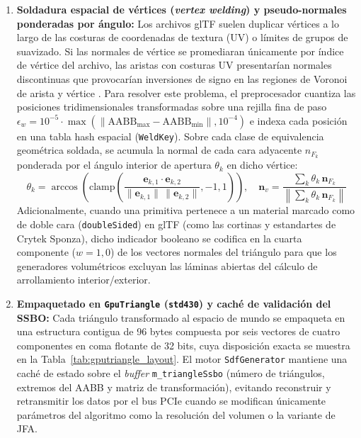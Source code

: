 \begin{enumerate}
  \begin{equation}
    \mathbf{M}_{\text{fit}} = \mathbf{T}(\mathbf{o}_w) \cdot \mathbf{S}(s, s, s) \cdot \mathbf{T}\!\left(-\frac{\text{AABB}_{\min} + \text{AABB}_{\max}}{2}\right)
  \end{equation}
  Este margen perimetral garantiza que la isosuperficie cero quede completamente contenida en el interior del dominio discretizado y evita discontinuidades de borde durante el muestreo trilineal.
  \item \textbf{Soldadura espacial de vértices (\textit{vertex welding}) y pseudo-normales ponderadas por ángulo:} Los archivos glTF suelen duplicar vértices a lo largo de las costuras de coordenadas de textura (UV) o límites de grupos de suavizado. Si las normales de vértice se promediaran únicamente por índice de vértice del archivo, las aristas con costuras UV presentarían normales discontinuas que provocarían inversiones de signo en las regiones de Voronoi de arista y vértice \cite{baerentzen2005}. Para resolver este problema, el preprocesador cuantiza las posiciones tridimensionales transformadas sobre una rejilla fina de paso $\epsilon_w = 10^{-5} \cdot \max(\|\text{AABB}_{\max} - \text{AABB}_{\min}\|, 10^{-4})$ e indexa cada posición en una tabla hash espacial (\texttt{WeldKey}). Sobre cada clase de equivalencia geométrica soldada, se acumula la normal de cada cara adyacente $n_{F_k}$ ponderada por el ángulo interior de apertura $\theta_k$ en dicho vértice:
  \begin{equation}
    \theta_k = \arccos\!\left(\text{clamp}\!\left(\frac{\mathbf{e}_{k,1} \cdot \mathbf{e}_{k,2}}{\|\mathbf{e}_{k,1}\| \, \|\mathbf{e}_{k,2}\|}, -1, 1\right)\right), \quad \mathbf{n}_v = \frac{\sum_{k} \theta_k \, \mathbf{n}_{F_k}}{\left\|\sum_{k} \theta_k \, \mathbf{n}_{F_k}\right\|}
  \end{equation}
  Adicionalmente, cuando una primitiva pertenece a un material marcado como de doble cara (\texttt{double\allowbreak Sided}) en glTF (como las cortinas y estandartes de Crytek Sponza), dicho indicador booleano se codifica en la cuarta componente ($w = 1,0$) de los vectores normales del triángulo para que los generadores volumétricos excluyan las láminas abiertas del cálculo de arrollamiento interior/exterior.
  \item \textbf{Empaquetado en \texttt{GpuTriangle} (\texttt{std430}) y caché de validación del SSBO:} Cada triángulo transformado al espacio de mundo se empaqueta en una estructura contigua de 96 bytes compuesta por seis vectores de cuatro componentes en coma flotante de 32 bits, cuya disposición exacta se muestra en la Tabla~\ref{tab:gputriangle_layout}. El motor \texttt{SdfGenerator} mantiene una caché de estado sobre el \textit{buffer} \texttt{m\_triangleSsbo} (número de triángulos, extremos del AABB y matriz de transformación), evitando reconstruir y retransmitir los datos por el bus PCIe cuando se modifican únicamente parámetros del algoritmo como la resolución del volumen o la variante de JFA.
\end{enumerate}

